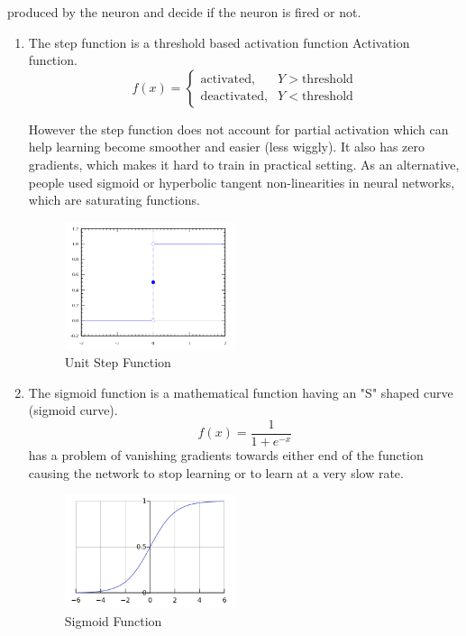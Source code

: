 produced by the neuron and decide if the neuron is fired or not. 
\begin{enumerate}[label=(\alph*)]
\item The step function is a threshold based activation function Activation function. 
\begin{equation}
    f(x)=\begin{cases}
            \text{activated}, & Y > \text{threshold} \\
            \text{deactivated}, & Y < \text{threshold}
        \end{cases}
\end{equation}

However the step function does not account for partial activation which can help learning become smoother and easier (less wiggly). It also has zero gradients, which makes it hard to train in practical setting. As an alternative, people used sigmoid or hyperbolic tangent non-linearities in neural networks, which are saturating functions. 
\begin{figure}[ht]
\centering
\includegraphics[width=50mm]{lectures/02-b/step_function.png}
\caption{Unit Step Function}
\label{fig:step_function}
\end{figure}

\item The sigmoid function is a mathematical function having an "S" shaped curve (sigmoid curve).
\begin{equation}
    f(x) = \frac{1}{1+e^{-x}}
\end{equation}
has a problem of vanishing gradients towards either end of the function causing the network to stop learning or to learn at a very slow rate.

\begin{figure}[ht]
\centering
\includegraphics[width=50mm]{lectures/02-b/sigmoid_function.png}
\caption{Sigmoid Function}
\label{fig:sigmoid}
\end{figure}


\end{enumerate}
